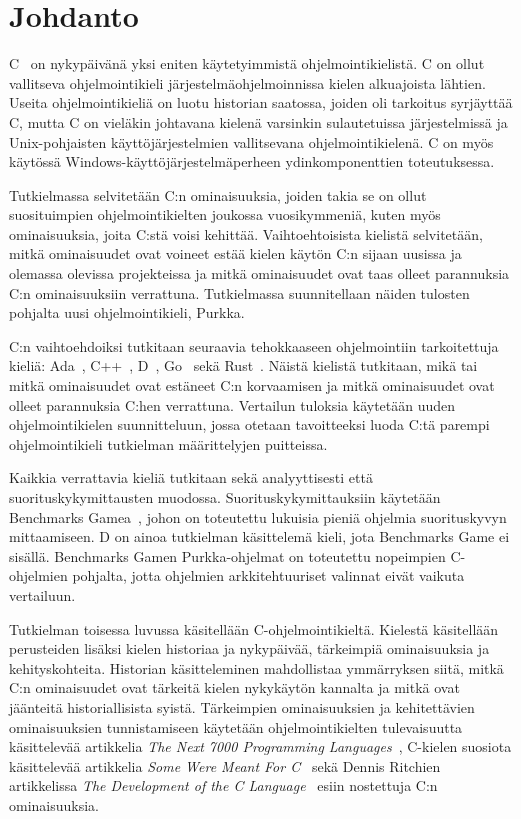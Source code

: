 \section{Johdanto}

C~\citep{C18} on nykypäivänä yksi eniten käytetyimmistä ohjelmointikielistä. C
on ollut vallitseva ohjelmointikieli järjestelmäohjelmoinnissa kielen
alkuajoista lähtien. Useita ohjelmointikieliä on luotu historian saatossa,
joiden oli tarkoitus syrjäyttää C, mutta C on vieläkin johtavana kielenä
varsinkin sulautetuissa järjestelmissä ja Unix-pohjaisten käyttöjärjestelmien
vallitsevana ohjelmointikielenä. C on myös käytössä
Windows-käyttöjärjestelmäperheen ydinkomponenttien toteutuksessa.

Tutkielmassa selvitetään C:n ominaisuuksia, joiden takia se on ollut
suosituimpien ohjelmointikielten joukossa vuosikymmeniä, kuten myös
ominaisuuksia, joita C:stä voisi kehittää. Vaihtoehtoisista kielistä
selvitetään, mitkä ominaisuudet ovat voineet estää kielen käytön C:n sijaan
uusissa ja olemassa olevissa projekteissa ja mitkä ominaisuudet ovat taas
olleet parannuksia C:n ominaisuuksiin verrattuna. Tutkielmassa suunnitellaan
näiden tulosten pohjalta uusi ohjelmointikieli, Purkka.

C:n vaihtoehdoiksi tutkitaan seuraavia tehokkaaseen ohjelmointiin tarkoitettuja
kieliä: Ada~\citep{ADA12}, C++~\citep{CPP17}, D~\citep{D}, Go~\citep{golang}
sekä Rust~\citep{rust}. Näistä kielistä tutkitaan, mikä tai mitkä ominaisuudet
ovat estäneet C:n korvaamisen ja mitkä ominaisuudet ovat olleet parannuksia
C:hen verrattuna. Vertailun tuloksia käytetään uuden ohjelmointikielen
suunnitteluun, jossa otetaan tavoitteeksi luoda C:tä parempi ohjelmointikieli
tutkielman määrittelyjen puitteissa.

Kaikkia verrattavia kieliä tutkitaan sekä analyyttisesti että
suorituskykymittausten muodossa. Suorituskykymittauksiin käytetään Benchmarks
Gamea~\citep{benchmarks}, johon on toteutettu lukuisia pieniä ohjelmia
suorituskyvyn mittaamiseen. D on ainoa tutkielman käsittelemä kieli, jota
Benchmarks Game ei sisällä. Benchmarks Gamen Purkka-ohjelmat on toteutettu
nopeimpien C-ohjelmien pohjalta, jotta ohjelmien arkkitehtuuriset valinnat
eivät vaikuta vertailuun. 

Tutkielman toisessa luvussa käsitellään C-ohjelmointikieltä. Kielestä
käsitellään perusteiden lisäksi kielen historiaa ja nykypäivää, tärkeimpiä
ominaisuuksia ja kehityskohteita. Historian käsitteleminen mahdollistaa
ymmärryksen siitä, mitkä C:n ominaisuudet ovat tärkeitä kielen nykykäytön
kannalta ja mitkä ovat jäänteitä historiallisista syistä. Tärkeimpien
ominaisuuksien ja kehitettävien ominaisuuksien tunnistamiseen käytetään
ohjelmointikielten tulevaisuutta käsittelevää artikkelia \emph{The Next 7000
Programming Languages}~\citep{next7000}, C-kielen suosiota käsittelevää
artikkelia \emph{Some Were Meant For C}~\citep{somemeantforc} sekä Dennis
Ritchien artikkelissa \emph{The Development of the C Language}~\citep{chistory}
esiin nostettuja C:n ominaisuuksia.

